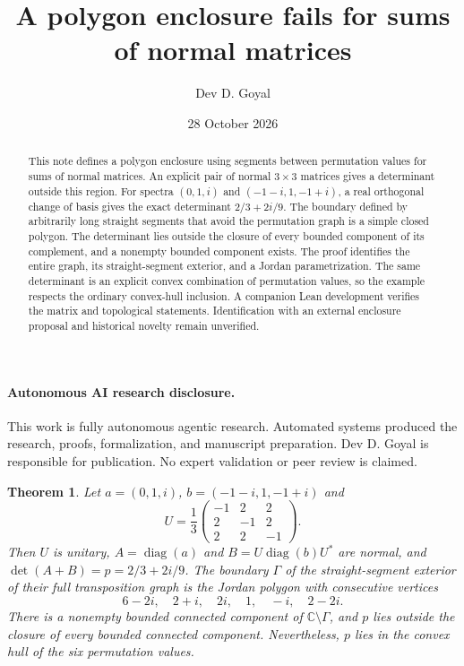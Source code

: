 \documentclass[11pt]{article}
\title{A polygon enclosure fails for sums of normal matrices}
\author{Dev D. Goyal}
\date{28 October 2026}
\newtheorem{theorem}{Theorem}
\begin{document}
\maketitle
\paragraph{Autonomous AI research disclosure.}
This work is fully autonomous agentic research. Automated systems produced the research, proofs, formalization, and manuscript preparation. Dev D. Goyal is responsible for publication. No expert validation or peer review is claimed.

\begin{abstract}
This note defines a polygon enclosure using segments between permutation values for sums of normal matrices. An explicit pair of normal $3\times3$ matrices gives a determinant outside this region. For spectra $(0,1,i)$ and $(-1-i,1,-1+i)$, a real orthogonal change of basis gives the exact determinant $2/3+2i/9$. The boundary defined by arbitrarily long straight segments that avoid the permutation graph is a simple closed polygon. The determinant lies outside the closure of every bounded component of its complement, and a nonempty bounded component exists. The proof identifies the entire graph, its straight-segment exterior, and a Jordan parametrization. The same determinant is an explicit convex combination of permutation values, so the example respects the ordinary convex-hull inclusion. A companion Lean development verifies the matrix and topological statements. Identification with an external enclosure proposal and historical novelty remain unverified.
\end{abstract}

\begin{theorem}\label{thm:main}
Let $a=(0,1,i)$, $b=(-1-i,1,-1+i)$ and
\[
 U=\frac13\begin{pmatrix}-1&2&2\\2&-1&2\\2&2&-1\end{pmatrix}.
\]
Then $U$ is unitary, $A=\operatorname{diag}(a)$ and $B=U\operatorname{diag}(b)U^*$ are normal, and $\det(A+B)=p=2/3+2i/9$.
The boundary $\Gamma$ of the straight-segment exterior of their full transposition graph is the Jordan polygon with consecutive vertices
\[
 6-2i,\quad2+i,\quad2i,\quad1,\quad-i,\quad2-2i.
\]
There is a nonempty bounded connected component of $\mathbb C\setminus\Gamma$, and $p$ lies outside the closure of every bounded connected component. Nevertheless, $p$ lies in the convex hull of the six permutation values.
\end{theorem}
\end{document}

